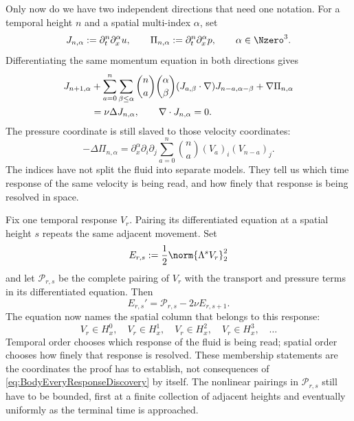 Only now do we have two independent directions that need one notation.  For a
temporal height \(n\) and a spatial multi-index \(\alpha\), set
\begin{equation}\label{eq:BodyMixedJetDefinition}
  J_{n,\alpha}:=\partial_t^n\partial_x^\alpha u,
  \qquad
  \Pi_{n,\alpha}:=\partial_t^n\partial_x^\alpha p,
  \qquad
  \alpha\in\Nzero^3.
\end{equation}
Differentiating the same momentum equation in both directions gives
\begin{align}
  J_{n+1,\alpha}
  &+
  \sum_{a=0}^{n}
  \sum_{\beta\leq\alpha}
  \binom{n}{a}\binom{\alpha}{\beta}
  (J_{a,\beta}\cdot\nabla)J_{n-a,\alpha-\beta}
  +\nabla\Pi_{n,\alpha}
  \notag\\
  &=\nu\Delta J_{n,\alpha},
  \qquad
  \nabla\cdot J_{n,\alpha}=0.
  \label{eq:BodyMixedJetRecurrence}
\end{align}
The pressure coordinate is still slaved to those velocity coordinates:
\begin{equation}\label{eq:BodyMixedPressureRecurrence}
  -\Delta\Pi_{n,\alpha}
  =\partial_x^\alpha\partial_i\partial_j
  \sum_{a=0}^{n}\binom{n}{a}(V_a)_i(V_{n-a})_j.
\end{equation}
The indices have not split the fluid into separate models.  They tell us which
time response of the same velocity is being read, and how finely that response
is being resolved in space.

Fix one temporal response \(V_r\).  Pairing its differentiated equation at a
spatial height \(s\) repeats the same adjacent movement.  Set
\[
  E_{r,s}:=\frac12\norm{\Lambda^sV_r}_2^2
\]
and let \(\mathcal P_{r,s}\) be the complete pairing of \(V_r\) with the
transport and pressure terms in its differentiated equation.  Then
\begin{equation}\label{eq:BodyEveryResponseDiscovery}
  E_{r,s}'=\mathcal P_{r,s}-2\nu E_{r,s+1}.
\end{equation}
The equation now names the spatial column that belongs to this response:
\[
  V_r\in H_x^0,
  \quad V_r\in H_x^1,
  \quad V_r\in H_x^2,
  \quad V_r\in H_x^3,
  \quad\ldots
\]
Temporal order chooses which response of the fluid is being read; spatial
order chooses how finely that response is resolved.  These membership
statements are the coordinates the proof has to establish, not consequences
of \eqref{eq:BodyEveryResponseDiscovery} by itself.  The nonlinear pairings in
\(\mathcal P_{r,s}\) still have to be bounded, first at a finite collection of
adjacent heights and eventually uniformly as the terminal time is approached.

